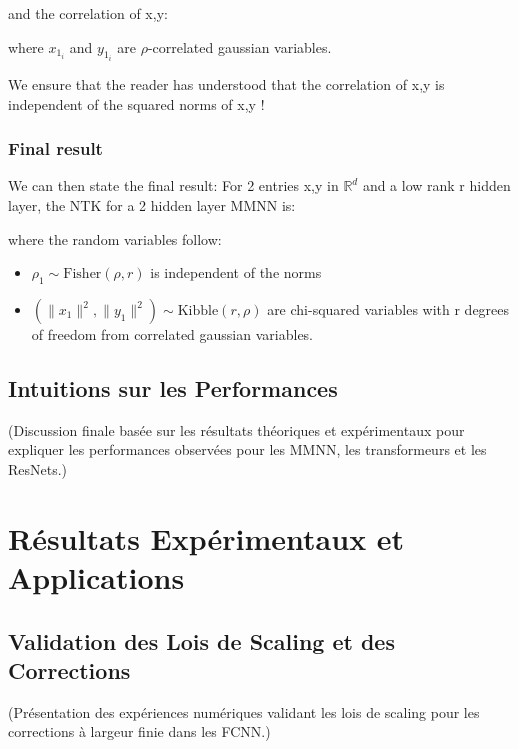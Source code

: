 \documentclass[a4paper]{article}
\begin{document}
and the correlation of x,y: 

where $x_1_i$ and $y_1_i$ are $\rho$-correlated gaussian variables.

We ensure that the reader has understood that the correlation of x,y is independent of the squared norms of x,y !

\subsubsection{Final result}
We can then state the final result: For 2 entries x,y in $\mathbb{R}^d$ and a low rank r hidden layer, the NTK for a 2 hidden layer MMNN is:


\begin{center}
    
    \newline
{}
\end{center}

where the random variables follow:
\begin{itemize}
\item $\rho_1 \sim \text{Fisher}(\rho, r)$ is independent of the norms
\item $(\|x_1\|^2, \|y_1\|^2) \sim \text{Kibble}(r, \rho)$ are chi-squared variables with r degrees of freedom from correlated gaussian variables.
\end{itemize}

\subsection{Intuitions sur les Performances}
(Discussion finale basée sur les résultats théoriques et expérimentaux pour expliquer les performances observées pour les MMNN, les transformeurs et les ResNets.)

\section{Résultats Expérimentaux et Applications}

\subsection{Validation des Lois de Scaling et des Corrections}
(Présentation des expériences numériques validant les lois de scaling pour les corrections à largeur finie dans les FCNN.)
\end{document}
